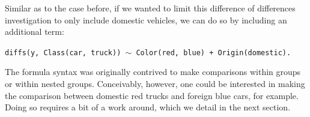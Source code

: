 Similar as to the case before, if we wanted to limit this difference of differences investigation to only include domestic vehicles, we can do so by including an additional term:

\begin{center}
\tt diffs(y, Class(car, truck)) $\sim$ Color(red, blue) + Origin(domestic).
\end{center}

The formula syntax was originally contrived to make comparisons within groups or within nested groups. Conceivably, however, one could be interested in making the comparison between domestic red trucks and foreign blue cars, for example. Doing so requires a bit of a work around, which we detail in the next section.
%
%
%
%
%
%
%
%
%

